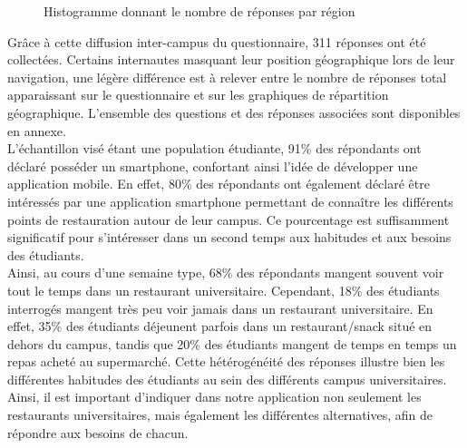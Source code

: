 \begin{figure}[H]
    \label{fig-histo-reponses}
    \noindent{}
    \caption{Histogramme donnant le nombre de réponses par région}
\end{figure}

Grâce à cette diffusion inter-campus du questionnaire, 311 réponses ont été collectées. Certains internautes masquant leur position géographique lors de leur navigation, une légère différence est à relever entre le nombre de réponses total apparaissant sur le questionnaire et sur les graphiques de répartition géographique. L'ensemble des questions et des réponses associées sont disponibles en annexe. \\

L'échantillon visé étant une population étudiante, 91\% des répondants ont déclaré posséder un smartphone, confortant ainsi l'idée de développer une application mobile. En effet, 80\% des répondants ont également déclaré être intéressés par une application smartphone permettant de connaître les différents points de restauration autour de leur campus. Ce pourcentage est suffisamment significatif pour s'intéresser dans un second temps aux habitudes et aux besoins des étudiants. \\

Ainsi, au cours d'une semaine type, 68\% des répondants mangent souvent voir tout le temps dans un restaurant universitaire. Cependant, 18\% des étudiants interrogés mangent très peu voir jamais dans un restaurant universitaire. En effet, 35\% des étudiants déjeunent parfois dans un restaurant/snack situé en dehors du campus, tandis que 20\% des étudiants mangent de temps en temps un repas acheté au supermarché. Cette hétérogénéité des réponses illustre bien les différentes habitudes des étudiants au sein des différents campus universitaires. Ainsi, il est important d'indiquer dans notre application non seulement les restaurants universitaires, mais également les différentes alternatives, afin de répondre aux besoins de chacun. \\


